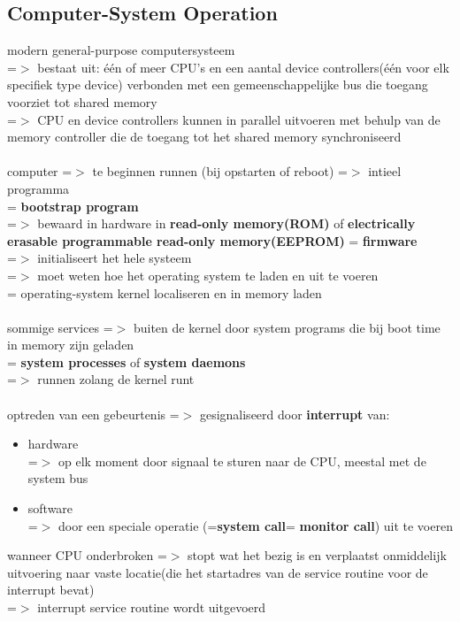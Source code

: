\documentclass{report}
\begin{document}
\subsection{Computer-System Operation}
modern general-purpose computersysteem
\\=$>$ bestaat uit: \'e\'en of meer CPU's en een aantal device controllers(\'e\'en voor elk specifiek type device) verbonden met een gemeenschappelijke bus die toegang voorziet tot shared memory
\\=$>$ CPU en device controllers kunnen in parallel uitvoeren met behulp van de memory controller die de toegang tot het shared memory synchroniseerd
\\
\\computer =$>$ te beginnen runnen (bij opstarten of reboot) =$>$ intieel programma 
\\= \textbf{bootstrap program}
\\=$>$ bewaard in hardware in \textbf{read-only memory(ROM)} of \textbf{electrically erasable programmable read-only memory(EEPROM)} = \textbf{firmware}
\\=$>$ initialiseert het hele systeem
\\=$>$ moet weten hoe het operating system te laden en uit te voeren
\\= operating-system kernel localiseren en in memory laden
\\
\\sommige services =$>$ buiten de kernel door system programs die bij boot time in memory zijn geladen
\\ = \textbf{system processes} of \textbf{system daemons}
\\ =$>$ runnen zolang de kernel runt
\\
\\optreden van een gebeurtenis =$>$ gesignaliseerd door \textbf{interrupt} van:
\begin{itemize}
\item hardware
\\=$>$ op elk moment door signaal te sturen naar de CPU, meestal met de system bus
\item software
\\=$>$ door een speciale operatie (=\textbf{system call}= \textbf{monitor call}) uit te voeren
\end{itemize}
wanneer CPU onderbroken =$>$ stopt wat het bezig is en verplaatst onmiddelijk uitvoering naar vaste locatie(die het startadres van de service routine voor de interrupt bevat)
\\=$>$ interrupt service routine wordt uitgevoerd
\end{document}

